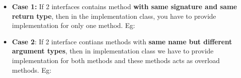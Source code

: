 \setlength{\columnsep}{3pt}
\begin{flushleft}
	
	\begin{itemize}
		
		\item \textbf{Case 1:} If 2 interfaces contains method \textbf{with same signature and same return type}, then in the implementation class, you have to provide implementation for only one method.
		\newline
		Eg:
		\bigskip
		
		\bigskip
		\bigskip
		\item \textbf{Case 2}: If 2 interface contians methods with \textbf{same name but different argument types}, then in implementation class we have to provide implementation for both methods and these methods acts as overload methods.
		\newpage
		Eg:
		\bigskip
\end{itemize}
\end{flushleft}
